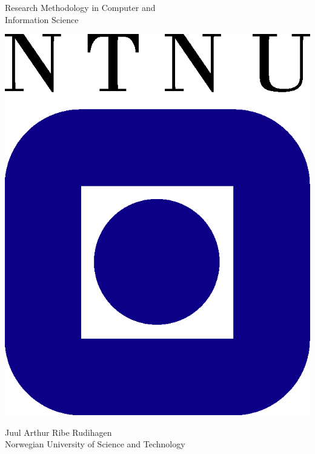 \begin{titlepage}
\begin{center}

    
  {\Huge Research Methodology in Computer and}\\[0.3cm]
  {\Huge Information Science} \\
  
  \vspace{3.0cm}

  \includegraphics{ntnu-logo2.png}

  \vspace{4.0cm}

  {\Large Juul Arthur Ribe Rudihagen} \\ [0.5cm]
  {\Large Norwegian University of Science and Technology}\\

  \vspace{4cm}

 


\end{center}
\end{titlepage}
